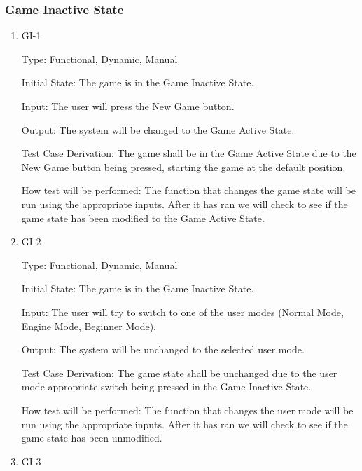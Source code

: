 \documentclass[12pt, titlepage]{article}
\begin{document}
  \subsubsection{Game Inactive State}
  
  \begin{enumerate}
  
    \item{GI-1\\}
  
    Type: Functional, Dynamic, Manual
                        
    Initial State: The game is in the Game Inactive State.
                        
    Input: The user will press the New Game button.
                        
    Output: The system will be changed to the Game Active State.
                        
    Test Case Derivation: The game shall be in the Game Active State due to the New Game button being pressed,
    starting the game at the default position.
    
    How test will be performed: The function that changes the game state will be run using the appropriate inputs.
    After it has ran we will check to see if the game state has been modified to the Game Active State.
  
    \item{GI-2\\}
  
    Type: Functional, Dynamic, Manual
                        
    Initial State: The game is in the Game Inactive State.
                        
    Input: The user will  try to switch to one of the user modes (Normal Mode, Engine Mode, Beginner Mode).
    
    Output: The system will be unchanged to the selected user mode.
                        
    Test Case Derivation: The game state shall be unchanged due to the user mode appropriate switch being pressed in the Game Inactive State.
    
    How test will be performed: The function that changes the user mode will be run using the appropriate inputs.
    After it has ran we will check to see if the game state has been unmodified.
  
    \item{GI-3\\}
  

\end{enumerate}
\end{document}
